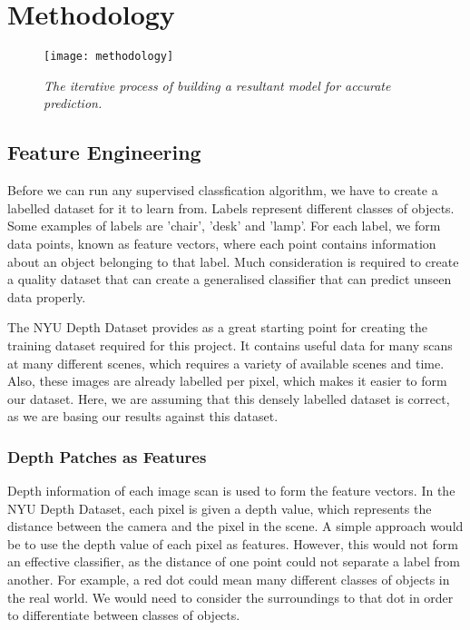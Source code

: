 \chapter{Methodology} \label{chap:methodology}

\begin{figure}[h]
  \centering
  \texttt{[image: methodology]}
  \caption{\textit{The iterative process of building a resultant model for accurate prediction.}}
  \label{fig:methodology}
\end{figure}

\section{Feature Engineering}
Before we can run any supervised classfication algorithm, we have to create a labelled dataset for it to learn from. Labels represent different classes of objects. Some examples of labels are 'chair', 'desk' and 'lamp'. For each label, we form data points, known as feature vectors, where each point contains information about an object belonging to that label. Much consideration is required to create a quality dataset that can create a generalised classifier that can predict unseen data properly.

The NYU Depth Dataset provides as a great starting point for creating the training dataset required for this project. It contains useful data for many scans at many different scenes, which requires a variety of available scenes and time. Also, these images are already labelled per pixel, which makes it easier to form our dataset. Here, we are assuming that this densely labelled dataset is correct, as we are basing our results against this dataset.

\subsection{Depth Patches as Features}
Depth information of each image scan is used to form the feature vectors. In the NYU Depth Dataset, each pixel is given a depth value, which represents the distance between the camera and the pixel in the scene. A simple approach would be to use the depth value of each pixel as features. However, this would not form an effective classifier, as the distance of one point could not separate a label from another. For example, a red dot could mean many different classes of objects in the real world. We would need to consider the surroundings to that dot in order to differentiate between classes of objects.


